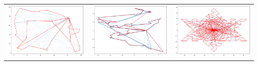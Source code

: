 \documentclass[a4paper]{article}
\newenvironment{ukol}[2][]{\begin{trivlist} 
\item[\hskip \labelsep {\bfseries #1}\hskip \labelsep {\bfseries #2}]}{\end{trivlist}}
\begin{document}
\begin{ukol}{Výsledky}
\begin{center}
\begin{tabular}{ c c c }
		 \includegraphics[width=.33\linewidth]{./path_32} & \includegraphics[width=.33\linewidth]{./path_72} & \includegraphics[width=.33\linewidth]{./path_422} \\ 
		\end{tabular}
\end{center}

\end{ukol}
\end{document}
